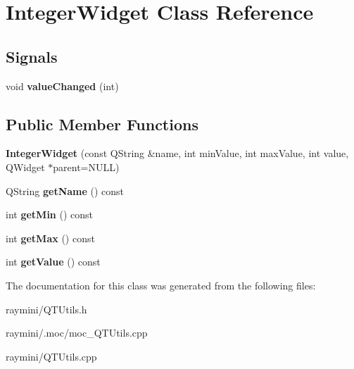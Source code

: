 \hypertarget{class_integer_widget}{
\section{IntegerWidget Class Reference}
\label{class_integer_widget}
}
\subsection*{Signals}
\begin{DoxyCompactItemize}
\item 
\hypertarget{class_integer_widget_aa03e99936c5ddade17ae797559bfbfb7}{
void {\bfseries valueChanged} (int)}
\label{class_integer_widget_aa03e99936c5ddade17ae797559bfbfb7}

\end{DoxyCompactItemize}
\subsection*{Public Member Functions}
\begin{DoxyCompactItemize}
\item 
\hypertarget{class_integer_widget_a0b1d0695d1359eb1a2eb768ea359a23a}{
{\bfseries IntegerWidget} (const QString \&name, int minValue, int maxValue, int value, QWidget $\ast$parent=NULL)}
\label{class_integer_widget_a0b1d0695d1359eb1a2eb768ea359a23a}

\item 
\hypertarget{class_integer_widget_adda829561fc393642baad9c79f87d2ce}{
QString {\bfseries getName} () const }
\label{class_integer_widget_adda829561fc393642baad9c79f87d2ce}

\item 
\hypertarget{class_integer_widget_a4633ac1169debbc71cc8bcf79c9bf94c}{
int {\bfseries getMin} () const }
\label{class_integer_widget_a4633ac1169debbc71cc8bcf79c9bf94c}

\item 
\hypertarget{class_integer_widget_ae9bb5484dce29b772013b5327aabb185}{
int {\bfseries getMax} () const }
\label{class_integer_widget_ae9bb5484dce29b772013b5327aabb185}

\item 
\hypertarget{class_integer_widget_ab339eb21f363158e7c92a3832d8d9d38}{
int {\bfseries getValue} () const }
\label{class_integer_widget_ab339eb21f363158e7c92a3832d8d9d38}

\end{DoxyCompactItemize}


The documentation for this class was generated from the following files:\begin{DoxyCompactItemize}
\item 
raymini/QTUtils.h\item 
raymini/.moc/moc\_\-QTUtils.cpp\item 
raymini/QTUtils.cpp\end{DoxyCompactItemize}
